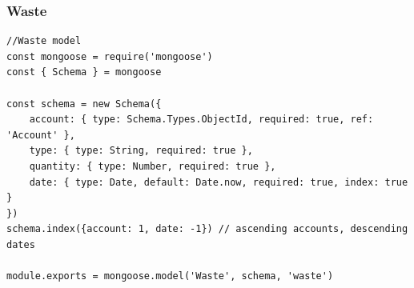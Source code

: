 \documentclass{report}
\begin{document}
\subsubsection{Waste}
\begin{lstlisting}
//Waste model
const mongoose = require('mongoose')
const { Schema } = mongoose

const schema = new Schema({
    account: { type: Schema.Types.ObjectId, required: true, ref: 'Account' },
    type: { type: String, required: true },
    quantity: { type: Number, required: true },
    date: { type: Date, default: Date.now, required: true, index: true }
})
schema.index({account: 1, date: -1}) // ascending accounts, descending dates

module.exports = mongoose.model('Waste', schema, 'waste')
\end{lstlisting}
\end{document}
